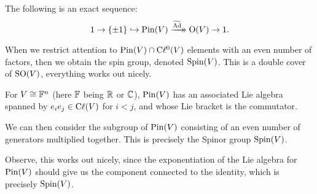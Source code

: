 \begin{theorem}
  The following is an exact sequence:
  \begin{equation}
1\to\{\pm1\}\hookrightarrow\operatorname{Pin}(V)\xrightarrow[]{\widetilde{\operatorname{Ad}}}\mathrel{\mkern-14mu}\rightarrow\mathrm{O}(V)\to1.
  \end{equation}
\end{theorem}

When we restrict attention to $\operatorname{Pin}(V)\cap\mathrm{C}\ell^{0}(V)$ elements with an
even number of factors, then we obtain the spin group, denoted $\operatorname{Spin}(V)$.
This is a double cover of $\operatorname{SO}(V)$, everything works out nicely.

For $V\cong\mathbb{F}^{n}$ (here $\mathbb{F}$ being $\mathbb{R}$ or $\mathbb{C}$), $\operatorname{Pin}(V)$ has an
associated Lie algebra spanned by $e_{i}e_{j}\in\mathrm{C}\ell(V)$ for $i<j$, and
whose Lie bracket is the commutator.

\M We can then consider the subgroup of $\operatorname{Pin}(V)$ consisting of an even
number of generators multiplied together. This is precisely the Spinor
group $\operatorname{Spin}(V)$.

Observe, this works out nicely, since the exponentiation of the Lie
algebra for $\operatorname{Pin}(V)$ should give us the component connected to the
identity, which is precisely $\operatorname{Spin}(V)$.

